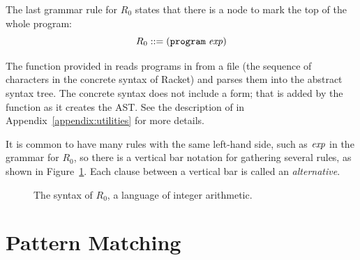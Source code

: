 \documentclass[11pt]{book}
\begin{document}
The last grammar rule for $R_0$ states that there is a 
node to mark the top of the whole program:
\[
  R_0 ::= (\texttt{program} \; \mathit{exp})
\]

The  function provided in 
reads programs in from a file (the sequence of characters in the
concrete syntax of Racket) and parses them into the abstract syntax
tree. The concrete syntax does not include a  form; that
is added by the  function as it creates the
AST. See the description of  in
Appendix~\ref{appendix:utilities} for more details.

It is common to have many rules with the same left-hand side, such as
$\mathit{exp}$ in the grammar for $R_0$, so there is a vertical bar notation
for gathering several rules, as shown in
Figure~\ref{fig:r0-syntax}. Each clause between a vertical bar is
called an {\em alternative}.

\begin{figure}[tp]
\caption{The syntax of $R_0$, a language of integer arithmetic.}
\label{fig:r0-syntax}
\end{figure}




\section{Pattern Matching}
\label{sec:pattern-matching}
\end{document}
